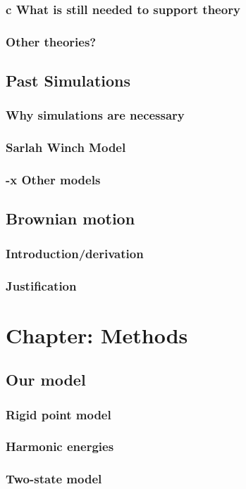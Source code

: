 \documentclass[10pt]{article} %
\begin{document}
		\subsubsection{c What is still needed to support theory}
		\subsubsection{Other theories?}
	\subsection{Past Simulations}
		\subsubsection{Why simulations are necessary}
		\subsubsection{Sarlah Winch Model}
		\subsubsection{-x Other models}
	\subsection{Brownian motion}
                \subsubsection{Introduction/derivation}
                \subsubsection{Justification}
\section{Chapter: Methods}
	\subsection{Our model}
		\subsubsection{Rigid point model}
		\subsubsection{Harmonic energies}
		\subsubsection{Two-state model}
\end{document}
